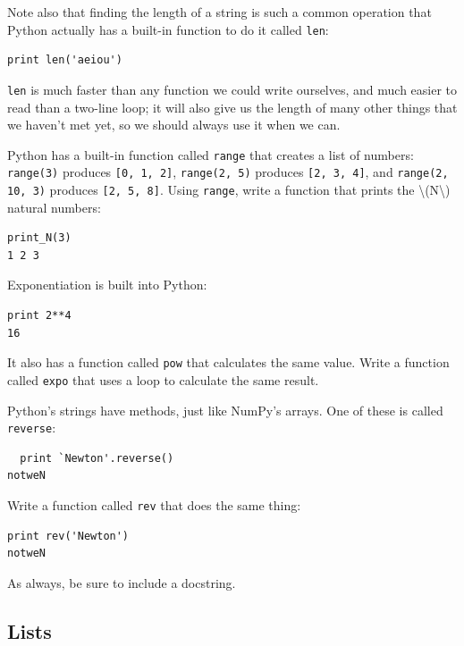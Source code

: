 \documentclass{book}
\begin{document}
Note also that finding the length of a string is such a common operation
that Python actually has a built-in function to do it called
\texttt{len}:

\begin{verbatim}
print len('aeiou')
\end{verbatim}

\texttt{len} is much faster than any function we could write ourselves,
and much easier to read than a two-line loop; it will also give us the
length of many other things that we haven't met yet, so we should always
use it when we can.

\begin{challenge}
  Python has a built-in function called \texttt{range} that creates a
  list of numbers: \texttt{range(3)} produces \texttt{{[}0, 1, 2{]}},
  \texttt{range(2, 5)} produces \texttt{{[}2, 3, 4{]}}, and
  \texttt{range(2, 10, 3)} produces \texttt{{[}2, 5, 8{]}}. Using
  \texttt{range}, write a function that prints the
  \textbackslash{}(N\textbackslash{}) natural numbers:
\begin{verbatim}
print_N(3)
1 2 3
\end{verbatim}
\end{challenge}

\begin{challenge}
  Exponentiation is built into Python:
\begin{verbatim}
print 2**4
16
\end{verbatim}
  It also has a function called
  \texttt{pow} that calculates the same value. Write a function called
  \texttt{expo} that uses a loop to calculate the same result.
\end{challenge}

\begin{challenge}
  Python's strings have methods, just like NumPy's arrays. One of these
  is called \texttt{reverse}:
\begin{verbatim}
  print `Newton'.reverse()
notweN
\end{verbatim}
  Write a function called \texttt{rev} that does the same thing:
\begin{verbatim}
print rev('Newton')
notweN
\end{verbatim}
  As always, be sure to include a
  docstring.
\end{challenge}

\subsection{Lists}
\end{document}
